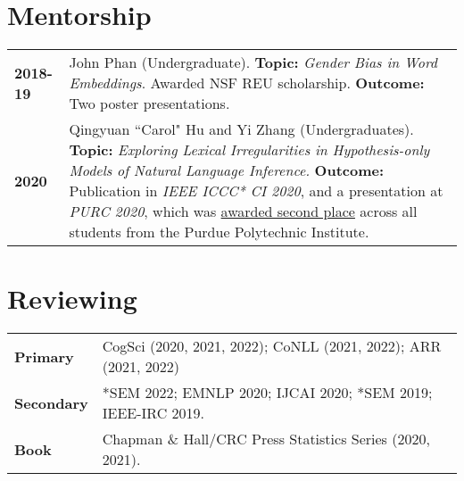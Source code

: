 \documentclass[11pt]{article}
\begin{document}




\renewcommand*{\arraystretch}{1.5}

\section*{Mentorship}
\vspace{-1em}
\begin{longtable}{p{}  p{} }
    \textbf{2018-19} & John Phan (Undergraduate). \textbf{Topic:} \textit{Gender Bias in Word Embeddings}. Awarded NSF REU scholarship. \textbf{Outcome:} Two poster presentations.\\
    \textbf{2020} & Qingyuan ``Carol" Hu and Yi Zhang (Undergraduates). \textbf{Topic:} \textit{Exploring Lexical Irregularities in Hypothesis-only Models of Natural Language Inference.} \textbf{Outcome:} Publication in \textit{IEEE ICCC* CI 2020}, and a presentation at \textit{PURC 2020}, which was \underline{awarded second place} across all students from the Purdue Polytechnic Institute.
\end{longtable}

\section*{Reviewing}
\vspace{-1em}
\begin{longtable}{p{}  p{} }
    \textbf{Primary} & CogSci (2020, 2021, 2022); CoNLL (2021, 2022); ARR (2021, 2022)\\
    \textbf{Secondary} & *SEM 2022; EMNLP 2020; IJCAI 2020; *SEM 2019; IEEE-IRC 2019.\\
    \textbf{Book} & Chapman \& Hall/CRC Press Statistics Series (2020, 2021).
\end{longtable}
\end{document}
